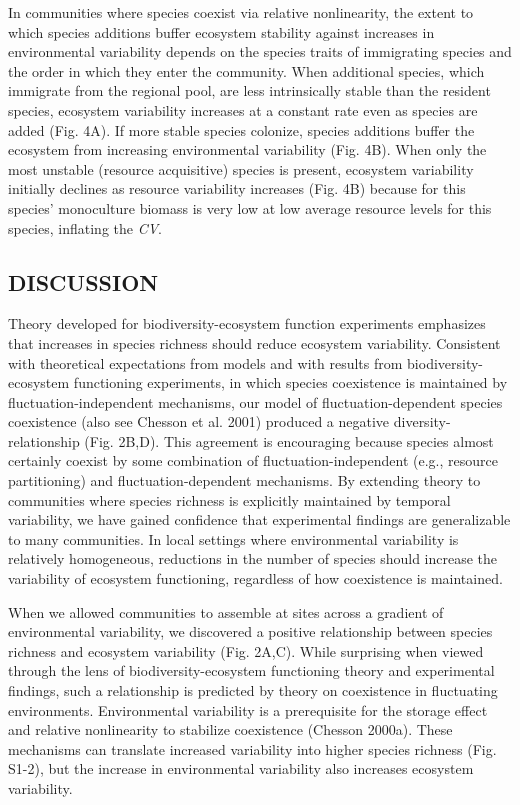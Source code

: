 \documentclass[12pt,]{article}
\begin{document}
In communities where species coexist via relative nonlinearity, the
extent to which species additions buffer ecosystem stability against
increases in environmental variability depends on the species traits of
immigrating species and the order in which they enter the community.
When additional species, which immigrate from the regional pool, are
less intrinsically stable than the resident species, ecosystem
variability increases at a constant rate even as species are added (Fig.
4A). If more stable species colonize, species additions buffer the
ecosystem from increasing environmental variability (Fig. 4B). When only
the most unstable (resource acquisitive) species is present, ecosystem
variability initially declines as resource variability increases (Fig.
4B) because for this species' monoculture biomass is very low at low
average resource levels for this species, inflating the \emph{CV}.

\subsection{DISCUSSION}\label{discussion}

Theory developed for biodiversity-ecosystem function experiments
emphasizes that increases in species richness should reduce ecosystem
variability. Consistent with theoretical expectations from models and
with results from biodiversity-ecosystem functioning experiments, in
which species coexistence is maintained by fluctuation-independent
mechanisms, our model of fluctuation-dependent species coexistence (also
see Chesson et al. 2001) produced a negative
diversity- relationship (Fig. 2B,D). This
agreement is encouraging because species almost certainly coexist by
some combination of fluctuation-independent (e.g., resource
partitioning) and fluctuation-dependent mechanisms. By extending theory
to communities where species richness is explicitly maintained by
temporal variability, we have gained confidence that experimental
findings are generalizable to many communities. In local settings where
environmental variability is relatively homogeneous, reductions in the
number of species should increase the variability of ecosystem
functioning, regardless of how coexistence is maintained.

When we allowed communities to assemble at sites across a gradient of
environmental variability, we discovered a positive relationship between
species richness and ecosystem variability (Fig. 2A,C). While surprising
when viewed through the lens of biodiversity-ecosystem functioning
theory and experimental findings, such a relationship is predicted by
theory on coexistence in fluctuating environments. Environmental
variability is a prerequisite for the storage effect and relative
nonlinearity to stabilize coexistence (Chesson 2000a). These mechanisms
can translate increased variability into higher species richness (Fig.
S1-2), but the increase in environmental variability also increases
ecosystem variability.
\end{document}
